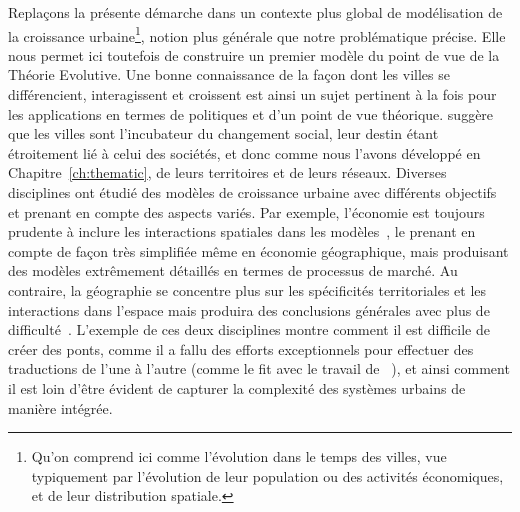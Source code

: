 {Replaçons la présente démarche dans un contexte plus global de modélisation de la croissance urbaine\footnote{Qu'on comprend ici comme l'évolution dans le temps des villes, vue typiquement par l'évolution de leur population ou des activités économiques, et de leur distribution spatiale.}, notion plus générale que notre problématique précise. Elle nous permet ici toutefois de construire un premier modèle du point de vue de la Théorie Evolutive. Une bonne connaissance de la façon dont les villes se différencient, interagissent et croissent est ainsi un sujet pertinent à la fois pour les applications en termes de politiques et d'un point de vue théorique. \cite{pumain2009innovation} suggère que les villes sont l'incubateur du changement social, leur destin étant étroitement lié à celui des sociétés, et donc comme nous l'avons développé en Chapitre~\ref{ch:thematic}, de leurs territoires et de leurs réseaux. Diverses disciplines ont étudié des modèles de croissance urbaine avec différents objectifs et prenant en compte des aspects variés. Par exemple, l'économie est toujours prudente à inclure les interactions spatiales dans les modèles~\cite{krugman1998space}, le prenant en compte de façon très simplifiée même en économie géographique, mais produisant des modèles extrêmement détaillés en termes de processus de marché. Au contraire, la géographie se concentre plus sur les spécificités territoriales et les interactions dans l'espace mais produira des conclusions générales avec plus de difficulté~\cite{marchionni2004geographical}. L'exemple de ces deux disciplines montre comment il est difficile de créer des ponts, comme il a fallu des efforts exceptionnels pour effectuer des traductions de l'une à l'autre (comme  le fit avec le travail de ~\cite{taylor2016polymath}), et ainsi comment il est loin d'être évident de capturer la complexité des systèmes urbains de manière intégrée.
}


